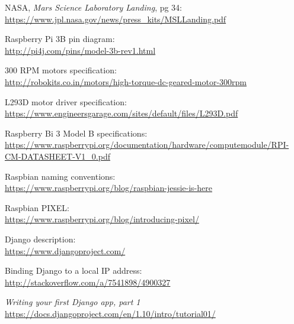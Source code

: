 \documentclass[a4paper, 12pt, onecolumn]{article}
\begin{document}
\begin{thebibliography}{10}	%
	
	 NASA, \textit{Mars Science Laboratory Landing}, pg 34: \\
	\url{https://www.jpl.nasa.gov/news/press_kits/MSLLanding.pdf}
	
	
	 Raspberry Pi 3B pin diagram: \\
	\url{http://pi4j.com/pins/model-3b-rev1.html}

	
	 300 RPM motors specification: \\
	\url{http://robokits.co.in/motors/high-torque-dc-geared-motor-300rpm}
	
	 L293D motor driver specification: \\
	\url{https://www.engineersgarage.com/sites/default/files/L293D.pdf}
	

	 Raspberry Bi 3 Model B specifications: \\
	\url{https://www.raspberrypi.org/documentation/hardware/computemodule/RPI-CM-DATASHEET-V1_0.pdf}
		
	
	 Raspbian naming conventions: \\
	\url{https://www.raspberrypi.org/blog/raspbian-jessie-is-here}
	
	 Raspbian PIXEL: \\
	\url{https://www.raspberrypi.org/blog/introducing-pixel/}
	
	 Django description: \\
	\url{https://www.djangoproject.com/}
	
	 Binding Django to a local IP address: \\
	\url{http://stackoverflow.com/a/7541898/4900327}
	
	 \textit{Writing your first Django app, part 1} \\
	\url{https://docs.djangoproject.com/en/1.10/intro/tutorial01/}
	
	
\end{thebibliography}
\end{document}
